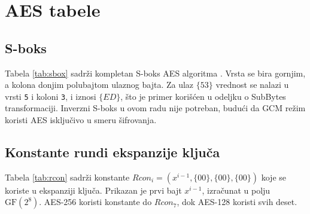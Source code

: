 \chapter{AES tabele}
\label{app:aes_tabele}

\section{S-boks}
\label{app:sbox}

Tabela \ref{tab:sbox} sadrži kompletan S-boks AES algoritma \cite{fips197}. Vrsta se bira gornjim, a kolona donjim polubajtom ulaznog bajta. Za ulaz $\{53\}$ vrednost se nalazi u vrsti \texttt{5} i koloni \texttt{3}, i iznosi $\{ED\}$, što je primer korišćen u odeljku o SubBytes transformaciji. Inverzni S-boks u ovom radu nije potreban, budući da GCM režim koristi AES isključivo u smeru šifrovanja.

\begin{table}[H]
\caption{AES S-boks: vrsta je gornji, kolona donji polubajt ulaza (heksadecimalno)}
\centering
\renewcommand{\arraystretch}{1.15}
\setlength{\tabcolsep}{4pt}
\resizebox{0.92\textwidth}{!}{

}
\label{tab:sbox}
\end{table}

\section{Konstante rundi ekspanzije ključa}
\label{app:rcon}

Tabela \ref{tab:rcon} sadrži konstante $Rcon_i = (x^{i-1}, \{00\}, \{00\}, \{00\})$ koje se koriste u ekspanziji ključa. Prikazan je prvi bajt $x^{i-1}$, izračunat u polju $\mathrm{GF}(2^8)$. AES-256 koristi konstante do $Rcon_7$, dok AES-128 koristi svih deset.

\begin{table}[H]
\caption{Rcon konstante ekspanzije ključa (prvi bajt, heksadecimalno)}
\centering
\renewcommand{\arraystretch}{1.15}
\resizebox{0.7\textwidth}{!}{

}
\label{tab:rcon}
\end{table}
